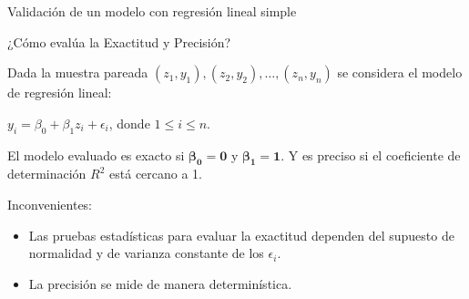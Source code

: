\documentclass[serif, aspectratio=169]{beamer}
\begin{document}
\begin{frame}{Validación de un modelo con regresión lineal simple}
	
	\begin{exampleblock}{¿Cómo evalúa la Exactitud y Precisión?}
	\end{exampleblock}	
	
	Dada la muestra pareada $(z_{1}, y_{1}), (z_{2}, y_{2}) , \dots , (z_{n}, y_{n})$ se considera el modelo de regresión lineal:
	
	\begin{center}
		$y_{i}= \beta_{0} + \beta_{1}z_{i} + \epsilon_i$, donde $ 1 \leq i\leq n$.
	\end{center} 
	
	El modelo evaluado es exacto si $\mathbf{\beta_{0} = 0}$ y  $\mathbf{\beta_{1} = 1}$. Y es preciso si el coeficiente de determinación $R^2$ está cercano a 1.
	
	\vspace{0.3cm}
	
	Inconvenientes:
	\begin{itemize}
		\item Las pruebas estadísticas para evaluar la exactitud dependen del supuesto de normalidad y de varianza constante de los $\epsilon_i$.
		\item La precisión se mide de manera determinística. 
	\end{itemize}
\end{frame}
\end{document}
